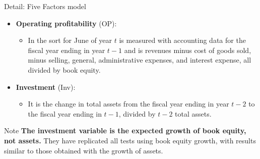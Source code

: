 \documentclass{beamer}
\begin{document}
\begin{frame}{Detail: Five Factors model}
	\begin{itemize}
		\item \textbf{Operating profitability} (OP):
		\begin{itemize}
			\item In the sort for June of year $ t $ is measured with accounting
			data for the fiscal year ending in year $ t-1 $ and is revenues minus cost of
			goods sold, minus selling, general, administrative expenses, and interest expense, all divided by book equity.
		\end{itemize}
	\item \textbf{Investment} (Inv):
	\begin{itemize}
		\item It is the change in total assets from the fiscal year ending in year $ t-2 $ to the fiscal year ending in $ t-1 $, divided by $ t-2 $ total assets.
	\end{itemize} 
	\end{itemize}
\begin{block}{Note}
	\textbf{The investment variable is the expected
	growth of book equity, not assets.} They have replicated all
	tests using book equity growth, with results similar to
	those obtained with the growth of assets. 
\end{block}
\end{frame}
\end{document}
